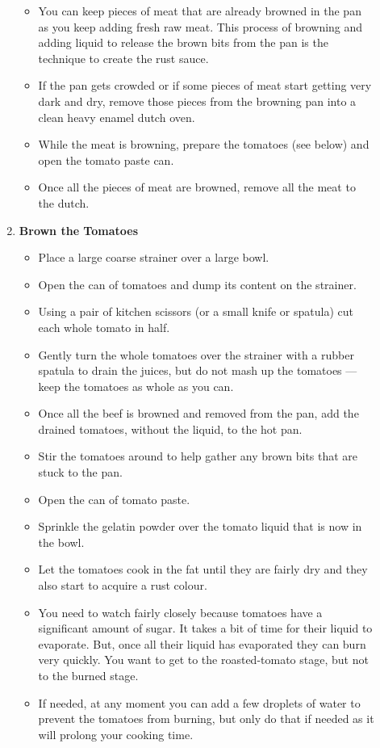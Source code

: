 \documentclass[11pt,letterpaper]{article}
\begin{document}
\begin{description}
\begin{enumerate}
\begin{itemize}
	 \item You can keep pieces of meat that are already browned in the pan as you keep adding fresh raw meat. This process of browning and adding liquid to release the brown bits from the pan is the technique to create the rust sauce. 
	 \item If the pan gets crowded or if some pieces of meat start getting very dark and dry, remove those pieces from the browning pan into a clean heavy enamel dutch oven.
	 \item While the meat is browning, prepare the tomatoes (see below) and open the tomato paste can.
	 \item Once all the pieces of meat are browned, remove all the meat to the dutch.
	\end{itemize}
	\item {\bf Brown the Tomatoes}
	\begin{itemize}
        		\item Place a large coarse strainer over a large bowl. 
		\item Open the can of tomatoes and dump its content on the strainer.
		\item Using a pair of kitchen scissors (or a small knife or spatula) cut each whole tomato in half.
		\item Gently turn the whole tomatoes over the strainer with a rubber spatula to drain the juices, but do not mash up the tomatoes --- keep the tomatoes as whole as you can.
		\item Once all the beef is browned and removed from the pan, add the drained tomatoes, without the liquid, to the hot pan.
		\item Stir the tomatoes around to help gather any brown bits that are stuck to the pan.
		\item Open the can of tomato paste. 
		\item Sprinkle the gelatin powder over the tomato liquid that is now in the bowl.
		\item Let the tomatoes cook in the fat until they are fairly dry and they also start to acquire a rust colour. 
		\item You need to watch fairly closely because tomatoes have a significant amount of sugar. It takes a bit of time for their liquid to evaporate. But, once all their liquid has evaporated they can burn very quickly. You want to get to the roasted-tomato stage, but not to the burned stage. 
		\item If needed, at any moment you can add a few droplets of water to prevent the tomatoes from burning, but only do that if needed as it will prolong your cooking time.

\end{itemize}
\end{enumerate}
\end{description}
\end{document}
